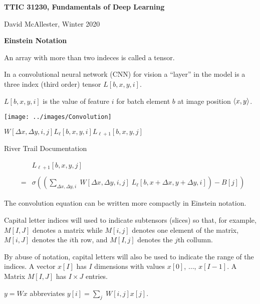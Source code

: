 




{\Huge
  
  \centerline{\bf TTIC 31230, Fundamentals of Deep Learning}
  \bigskip
  \centerline{David McAllester, Winter 2020}
  \vfill
  \vfill
  \centerline{\bf Einstein Notation}
  \vfill
  \vfill
  \vfill


An array with more than two indeces is called a {\color{red} tensor}.

\vfill
In a convolutional neural network (CNN) for vision a ``layer'' in the model is a three index (third order) tensor {\color{red} $L[b,x,y,i]$}.

\vfill
{\color{red} $L[b,x,y,i]$} is the value of feature $i$ for batch element $b$ at image position ${\mbox{$\langle x,y\rangle$}}$.


\centerline{\texttt{[image: ../images/Convolution]}}
\centerline{$W[\Delta x,\Delta y,i,j]$\hspace{6ex}$L_{{\ell}}[b,x,y,i]$\hspace{6ex}$L_{{\ell+1}}[b,x,y,j]$}
\centerline{\large River Trail Documentation}

\vfill
\begin{eqnarray*}
 & &  L_{{\ell+1}}[b,x,y,j] \\
 \\
 & = &   \sigma\left(\left(\sum_{\Delta x, \Delta y, i}\;W[\Delta x, \Delta y, i,j]\; L_{{\ell}}[b,x + \Delta x, y + \Delta y, i]\right) - B[j]\right)\end{eqnarray*}


The convolution equation can be written more compactly in Einstein notation.

\vfill
Capital letter indices will used to indicate subtensors (slices) so that, for example,  $M[I,J]$ denotes a matrix
while $M[i,j]$ denotes one element of the matrix, $M[i,J]$ denotes the $i$th row, and $M[I,j]$ denotes the $j$th collumn.

\vfill
By abuse of notation, capital letters will also be used to indicate the range of the indices.  A vector $x[I]$ has $I$ dimensions with values   
$x[0]$, $\ldots$, $x[I-1]$.  A Matrix $M[I,J]$ has $I \times J$ entries.



$y = Wx$ \hfill abbreviates \hfill $y[i] = \sum_j \;W[i,j]x[j]$.

}
